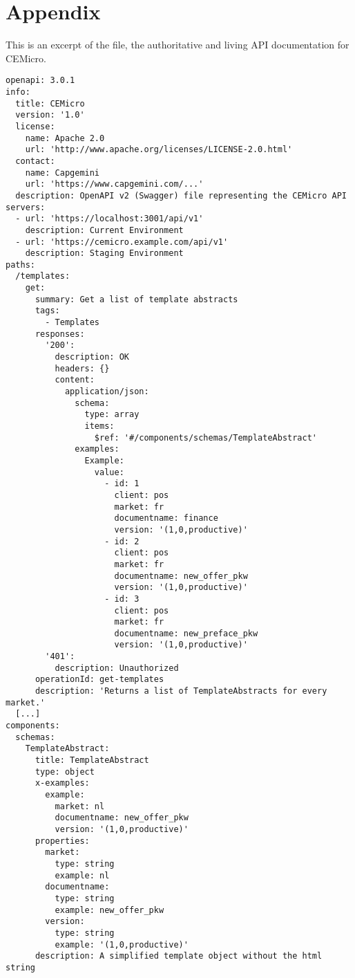 \chapter{Appendix}
\label{sec:appendix}

This is an excerpt of the  file, the authoritative and living API documentation for CEMicro.

\begin{lstlisting}
openapi: 3.0.1
info:
  title: CEMicro
  version: '1.0'
  license:
    name: Apache 2.0
    url: 'http://www.apache.org/licenses/LICENSE-2.0.html'
  contact:
    name: Capgemini
    url: 'https://www.capgemini.com/...'
  description: OpenAPI v2 (Swagger) file representing the CEMicro API
servers:
  - url: 'https://localhost:3001/api/v1'
    description: Current Environment
  - url: 'https://cemicro.example.com/api/v1'
    description: Staging Environment
paths:
  /templates:
    get:
      summary: Get a list of template abstracts
      tags:
        - Templates
      responses:
        '200':
          description: OK
          headers: {}
          content:
            application/json:
              schema:
                type: array
                items:
                  $ref: '#/components/schemas/TemplateAbstract'
              examples:
                Example:
                  value:
                    - id: 1
                      client: pos
                      market: fr
                      documentname: finance
                      version: '(1,0,productive)'
                    - id: 2
                      client: pos
                      market: fr
                      documentname: new_offer_pkw
                      version: '(1,0,productive)'
                    - id: 3
                      client: pos
                      market: fr
                      documentname: new_preface_pkw
                      version: '(1,0,productive)'
        '401':
          description: Unauthorized
      operationId: get-templates
      description: 'Returns a list of TemplateAbstracts for every market.'
  [...]
components:
  schemas:
    TemplateAbstract:
      title: TemplateAbstract
      type: object
      x-examples:
        example:
          market: nl
          documentname: new_offer_pkw
          version: '(1,0,productive)'
      properties:
        market:
          type: string
          example: nl
        documentname:
          type: string
          example: new_offer_pkw
        version:
          type: string
          example: '(1,0,productive)'
      description: A simplified template object without the html string

\end{lstlisting}
